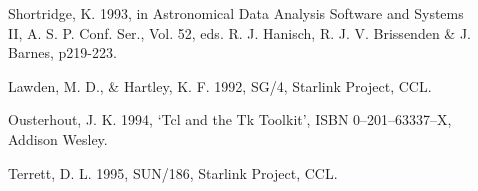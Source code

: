 \documentclass[a4paper]{book}
\renewcommand{\_}{{\tt\char'137}}
\begin{document}
\begin{description}
\item[] Shortridge, K. 1993, in  Astronomical Data Analysis Software
      and Systems II, A. S. P. Conf. Ser., Vol. 52, eds. R. J. Hanisch, 
      R. J. V. Brissenden \& J. Barnes, p219-223.
\item[] Lawden, M. D., \& Hartley, K. F. 1992, SG/4, Starlink Project, CCL.
\item[] Ousterhout, J. K. 1994, `Tcl and the Tk Toolkit', ISBN 0--201--63337--X, Addison Wesley.
\item[] Terrett, D. L. 1995, SUN/186, Starlink Project, CCL.
\end{description}
\end{document}
